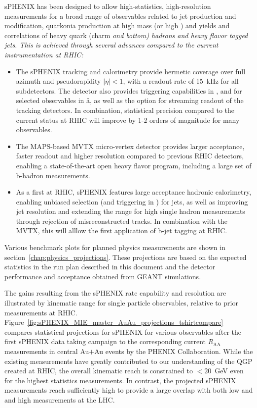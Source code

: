 sPHENIX has been designed to allow high-statistics, high-resolution measurements for a broad
range of observables related to jet production and modification, quarkonia production
at high mass (or high \pt) and yields and correlations of heavy quark (charm \em and \em bottom) hadrons and heavy flavor tagged jets.
This is achieved through several advances compared to the current instrumentation at RHIC:
\begin{itemize}
    \item The sPHENIX tracking and calorimetry provide hermetic coverage over full azimuth and pseudorapidity $|\eta| < 1$, with a readout rate of 15~kHz for all subdetectors. The detector also provides triggering capabilities in \pp, and for selected observables in \aa, as well as the option for streaming readout of the tracking detectors. In combination, statistical precision compared to the current status at RHIC will improve  by 1-2 orders of magnitude for many observables.
    \item The MAPS-based MVTX micro-vertex detector provides larger acceptance, faster readout and higher resolution compared to previous RHIC detectors, enabling a state-of-the-art open heavy flavor program, including a large set of b-hadron measurements. 
    \item As a first at RHIC, sPHENIX features large acceptance hadronic calorimetry, enabling unbiased selection (and triggering in \pp) for jets, as well as improving jet resolution and extending the range for high \pt single hadron measurements through rejection of misreconstructed tracks. In combination with the MVTX, this will alllow the first application of b-jet tagging at RHIC. 
\end{itemize}
Various benchmark plots for planned physics
measurements are shown in section~\ref{chap:physics_projections}. These projections are based on the expected statistics in the run plan described in this document and the detector performance and acceptance obtained from GEANT simulations.

The gains resulting from the sPHENIX rate capability and resolution are illustrated by kinematic range for single particle observables, relative to prior measurements at RHIC.
Figure~\ref{fig:sPHENIX_MIE_master_AuAu_projections_tshirtcompare} compares
statistical projections for sPHENIX for various observables after the first sPHENIX data
taking campaign to the corresponding current $R_\mathrm{AA}$ measurements in central
Au$+$Au events by the PHENIX Collaboration.
While the existing measurements have greatly contributed to our
understanding of the QGP created at RHIC, the overall kinematic reach is
constrained to $< 20$~GeV even for the highest statistics
measurements. In contrast, the projected sPHENIX measurements reach sufficiently high \pt to
provide a large overlap with both low and and high \pt measurements at the LHC.

